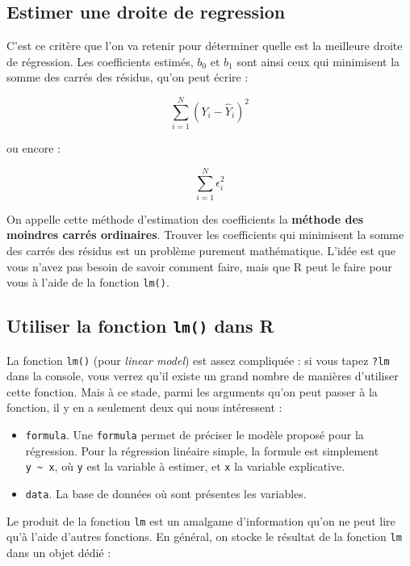 \documentclass[
  french,
]{book}
\providecommand{\tightlist}{%
  \setlength{\itemsep}{0pt}\setlength{\parskip}{0pt}}
\begin{document}
\hypertarget{estimer-une-droite-de-regression}{%
\subsection{Estimer une droite de regression}\label{estimer-une-droite-de-regression}}

C'est ce critère que l'on va retenir pour déterminer quelle est la meilleure droite de régression. Les coefficients estimés, \(b_0\) et \(b_1\) sont ainsi ceux qui minimisent la somme des carrés des résidus, qu'on peut écrire :

\[ \sum^{N}_{i = 1} (Y_i- \hat{Y}_i)^2 \]

ou encore :

\[ \sum^{N}_{i = 1} \epsilon_i^2 \]

On appelle cette méthode d'estimation des coefficients la \textbf{méthode des moindres carrés ordinaires}. Trouver les coefficients qui minimisent la somme des carrés des résidus est un problème purement mathématique. L'idée est que vous n'avez pas besoin de savoir comment faire, mais que R peut le faire pour vous à l'aide de la fonction \texttt{lm()}.

\hypertarget{utiliser-la-fonction-lm-dans-r}{%
\subsection{\texorpdfstring{Utiliser la fonction \texttt{lm()} dans R}{Utiliser la fonction lm() dans R}}\label{utiliser-la-fonction-lm-dans-r}}

La fonction \texttt{lm()} (pour \emph{linear model}) est assez compliquée : si vous tapez \texttt{?lm} dans la console, vous verrez qu'il existe un grand nombre de manières d'utiliser cette fonction. Mais à ce stade, parmi les arguments qu'on peut passer à la fonction, il y en a seulement deux qui nous intéressent :

\begin{itemize}
\tightlist
\item
  \texttt{formula}. Une \texttt{formula} permet de préciser le modèle proposé pour
  la régression. Pour la régression linéaire simple, la formule est
  simplement \texttt{y\ \textasciitilde{}\ x}, où \texttt{y} est la variable à estimer, et \texttt{x} la
  variable explicative.
\item
  \texttt{data}. La base de données où sont présentes les variables.
\end{itemize}

Le produit de la fonction \texttt{lm} est un amalgame d'information qu'on ne peut lire qu'à l'aide d'autres fonctions. En général, on stocke le résultat de la fonction \texttt{lm} dans un objet dédié :
\end{document}
